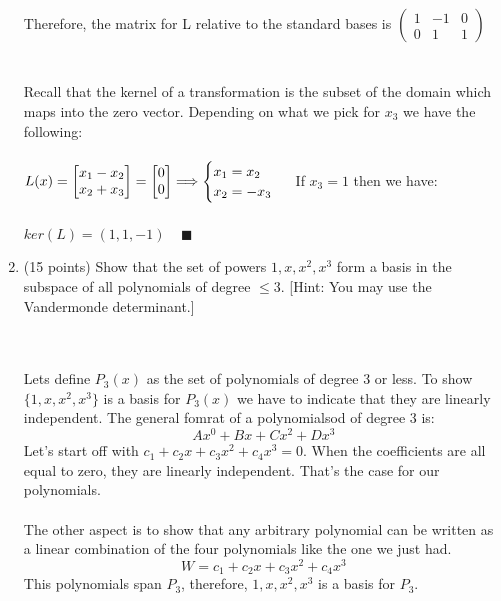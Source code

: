 \documentclass[fleqn]{article}
\begin{document}
\begin{enumerate}
{        \\
        \\
        Therefore, the matrix for L relative to the standard bases is
        $
          \begin{pmatrix}
            1 & -1 & 0
            \\
            0 & 1 & 1
          \end{pmatrix}
        $
        \\
        \\
        \\
        Recall that the kernel of a transformation is the subset of the domain which maps into the zero vector.
        Depending on what we pick for $x_3$ we have the following:
        \\
        \\
        $
          L(x)=\begin{bmatrix}
            x_1-x_2
            \\
            x_2+x_3
          \end{bmatrix}=\begin{bmatrix}
            0
            \\
            0
          \end{bmatrix}
          \Longrightarrow \begin{cases}
            x_1=x_2
            \\
            x_2=-x_3
          \end{cases}
          \\
          \\
        $
        If $x_3=1$ then we have: 
        \\
        \\
        $
          ker(L)=\left(1, 1, -1\right) ~~~~~ \blacksquare
        $
      }

    \item (15 points) Show that the set of powers $1, x, x^2, x^3$ form a basis in the subspace of all polynomials of degree $\leq 3$. 
    [Hint: You may use the Vandermonde determinant.]


      \textcolor{hwColor}{
        \\
        \\
        Lets define $P_3(x)$ as the set of polynomials of degree 3 or less. 
        To show $\{1, x, x^2, x^3\}$ is a basis for $P_3(x)$ we have to indicate that 
        they are linearly independent. The general fomrat of a polynomialsod of degree 3 is:
        $$Ax^0+Bx+Cx^2+Dx^3$$
        Let's start off with $c_1+c_2 x+c_3 x^2+c_4x^3=0$. When the coefficients are all equal to zero, 
        they are linearly independent. That's the case for our polynomials.
        \\
        \\
        The other aspect is to show that any arbitrary polynomial can be written as a linear combination
        of the four polynomials like the one we just had. 
        $$W=c_1+c_2 x+c_3 x^2+c_4x^3$$
        This polynomials span $P_3$, therefore, $1, x, x^2, x^3$ is a basis for $P_3$.
      }


\end{enumerate}
\end{document}

